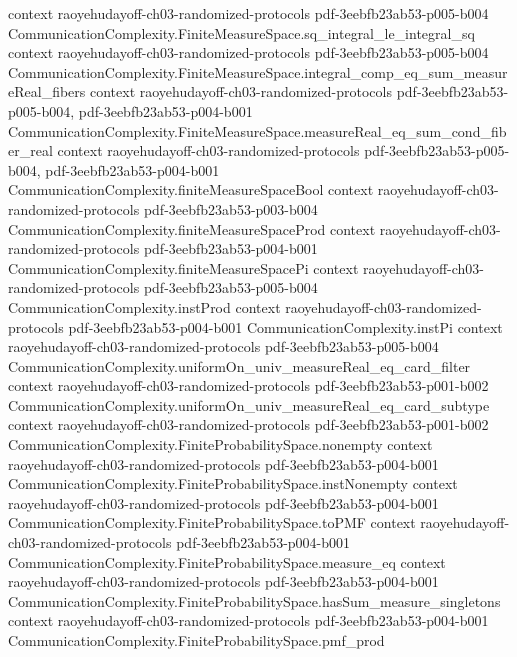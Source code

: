 \begin{theorem}
  {context}
  {raoyehudayoff-ch03-randomized-protocols}
  {pdf-3eebfb23ab53-p005-b004}
\proofstep
  {CommunicationComplexity.FiniteMeasureSpace.sq_integral_le_integral_sq}
  {context}
  {raoyehudayoff-ch03-randomized-protocols}
  {pdf-3eebfb23ab53-p005-b004}
\proofstep
  {CommunicationComplexity.FiniteMeasureSpace.integral_comp_eq_sum_measureReal_fibers}
  {context}
  {raoyehudayoff-ch03-randomized-protocols}
  {pdf-3eebfb23ab53-p005-b004,
    pdf-3eebfb23ab53-p004-b001}
\proofstep
  {CommunicationComplexity.FiniteMeasureSpace.measureReal_eq_sum_cond_fiber_real}
  {context}
  {raoyehudayoff-ch03-randomized-protocols}
  {pdf-3eebfb23ab53-p005-b004,
    pdf-3eebfb23ab53-p004-b001}
\proofstep
  {CommunicationComplexity.finiteMeasureSpaceBool}
  {context}
  {raoyehudayoff-ch03-randomized-protocols}
  {pdf-3eebfb23ab53-p003-b004}
\proofstep
  {CommunicationComplexity.finiteMeasureSpaceProd}
  {context}
  {raoyehudayoff-ch03-randomized-protocols}
  {pdf-3eebfb23ab53-p004-b001}
\proofstep
  {CommunicationComplexity.finiteMeasureSpacePi}
  {context}
  {raoyehudayoff-ch03-randomized-protocols}
  {pdf-3eebfb23ab53-p005-b004}
\proofstep
  {CommunicationComplexity.instProd}
  {context}
  {raoyehudayoff-ch03-randomized-protocols}
  {pdf-3eebfb23ab53-p004-b001}
\proofstep
  {CommunicationComplexity.instPi}
  {context}
  {raoyehudayoff-ch03-randomized-protocols}
  {pdf-3eebfb23ab53-p005-b004}
\proofstep
  {CommunicationComplexity.uniformOn_univ_measureReal_eq_card_filter}
  {context}
  {raoyehudayoff-ch03-randomized-protocols}
  {pdf-3eebfb23ab53-p001-b002}
\proofstep
  {CommunicationComplexity.uniformOn_univ_measureReal_eq_card_subtype}
  {context}
  {raoyehudayoff-ch03-randomized-protocols}
  {pdf-3eebfb23ab53-p001-b002}
\proofstep
  {CommunicationComplexity.FiniteProbabilitySpace.nonempty}
  {context}
  {raoyehudayoff-ch03-randomized-protocols}
  {pdf-3eebfb23ab53-p004-b001}
\proofstep
  {CommunicationComplexity.FiniteProbabilitySpace.instNonempty}
  {context}
  {raoyehudayoff-ch03-randomized-protocols}
  {pdf-3eebfb23ab53-p004-b001}
\proofstep
  {CommunicationComplexity.FiniteProbabilitySpace.toPMF}
  {context}
  {raoyehudayoff-ch03-randomized-protocols}
  {pdf-3eebfb23ab53-p004-b001}
\proofstep
  {CommunicationComplexity.FiniteProbabilitySpace.measure_eq}
  {context}
  {raoyehudayoff-ch03-randomized-protocols}
  {pdf-3eebfb23ab53-p004-b001}
\proofstep
  {CommunicationComplexity.FiniteProbabilitySpace.hasSum_measure_singletons}
  {context}
  {raoyehudayoff-ch03-randomized-protocols}
  {pdf-3eebfb23ab53-p004-b001}
\proofstep
  {CommunicationComplexity.FiniteProbabilitySpace.pmf_prod}

\end{theorem}
